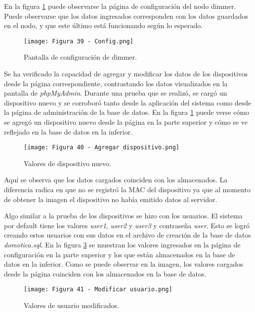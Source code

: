 En la figura \ref{fig:39} puede observarse la página de configuración del nodo dimmer. Puede observarse que los datos ingresados corresponden con los datos guardados en el nodo, y que este último está funcionando según lo esperado.

\begin{figure}[h]
\centering
\texttt{[image: Figura 39 - Config.png]}
\caption[Config dimmer]{Pantalla de configuración de dimmer.}
\label{fig:39}
\end{figure}

Se ha verificado la capacidad de agregar y modificar los datos de los dispositivos desde la página correspondiente, contrastando los datos visualizados en la pantalla de \textit{phpMyAdmin}. Durante una prueba que se realizó, se cargó un dispositivo nuevo y se corroboró tanto desde la aplicación del sistema como desde la página de administración de la base de datos. En la figura \ref{fig:39} puede verse cómo se agregó un dispositivo nuevo desde la página en la parte superior y cómo se ve reflejado en la base de datos en la inferior.

\newpage
\begin{figure}[h]
\centering
\texttt{[image: Figura 40 - Agregar dispositivo.png]}
\caption[Agregar dispositivo]{Valores de dispositivo nuevo.}
\label{fig:40}
\end{figure}

Aquí se observa que los datos cargados coinciden con los almacenados. La diferencia radica en que no se registró la MAC del dispositivo ya que al momento de obtener la imagen el dispositivo no había emitido datos al servidor.

Algo similar a la prueba de los dispositivos se hizo con los usuarios. El sistema por default tiene los valores \textit{user1}, \textit{user2} y \textit{user3} y contraseña \textit{user}. Esto se logró creando estos usuarios con sus datos en el archivo de creación de la base de datos \textit{domotica.sql}. En la figura \ref{fig:41} se muestran los valores ingresados en la página de configuración en la parte superior y los que están almacenados en la base de datos en la inferior. Como se puede observar en la imagen, los valores cargados desde la página coinciden con los almacenados en la base de datos.

\begin{figure}[h]
\centering
\texttt{[image: Figura 41 - Modificar usuario.png]}
\caption[Cambiar usuario]{Valores de usuario modificados.}
\label{fig:41}
\end{figure}

